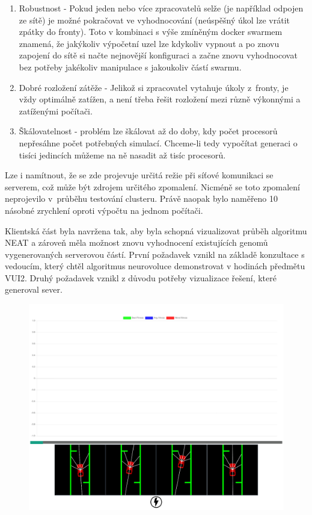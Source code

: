 \begin{enumerate}
	\item Robustnost - Pokud jeden nebo více zpracovatelů selže (je například odpojen ze sítě) je možné pokračovat ve vyhodnocování (neúspěšný úkol lze vrátit zpátky do fronty). Toto v kombinaci s výše zmíněným docker swarmem znamená, že jakýkoliv výpočetní uzel lze kdykoliv vypnout a po znovu zapojení do sítě si načte nejnovější konfiguraci a začne znovu vyhodnocovat bez potřeby jakékoliv manipulace s jakoukoliv částí swarmu.
	\item Dobré rozložení zátěže - Jelikož si zpracovatel vytahuje úkoly z~fronty, je vždy optimálně zatížen, a není třeba řešit rozložení mezi různě výkonnými a zatíženými počítači.
	\item Škálovatelnost - problém lze škálovat až do doby, kdy počet procesorů nepřesáhne počet potřebných simulací. Chceme-li tedy vypočítat generaci o tisíci jedincích můžeme na ně nasadit až tisíc procesorů.
\end{enumerate}

Lze i namítnout, že se zde projevuje určitá režie při síťové komunikaci se serverem, což může být zdrojem určitého zpomalení. Nicméně se toto zpomalení neprojevilo v~průběhu testování clusteru. Právě naopak bylo naměřeno 10 násobné zrychlení oproti výpočtu na jednom počítači.

Klientská část byla navržena tak, aby byla schopná vizualizovat průběh algoritmu NEAT a zároveň měla možnost znovu vyhodnocení existujících genomů vygenerovaných serverovou částí. První požadavek vznikl na základě konzultace s vedoucím, který chtěl algoritmus neurovoluce demonstrovat v hodinách předmětu VUI2. Druhý požadavek vznikl z důvodu potřeby vizualizace řešení, které generoval sever.


\begin{figure}
	\centering
	\includegraphics[width=0.7\linewidth]{visualization}
	\caption{}
	\label{fig:visualization}
\end{figure}


